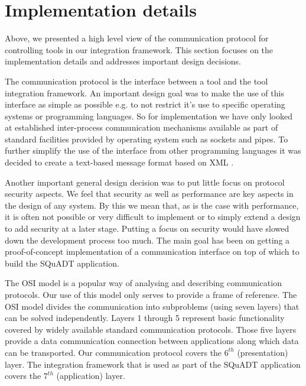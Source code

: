 \documentclass{article}
\newcommand{\squadt}{SQuADT\xspace}
\begin{document}
 \section{Implementation details} \label{s:protocol_implementation}

   Above, we presented a high level view of the communication protocol for
   controlling tools in our integration framework. This section focuses on the
   implementation details and addresses important design decisions.
   
   The communication protocol is the interface between a tool and the tool
   integration framework. An important design goal was to make the use of this
   interface as simple as possible e.g. to not restrict it's use to specific
   operating systems or programming languages. So for implementation we
   have only looked at established inter-process communication mechanisms
   available as part of standard facilities provided by operating system such
   as sockets and pipes.  To further simplify the use of the interface from
   other programming languages it was decided to create a text-based message
   format based on XML \cite{XML-1_0-4}.

   Another important general design decision was to put little focus on protocol
   security aspects. We feel that security as well as performance are key
   aspects in the design of any system. By this we mean that, as is the case with
   performance, it is often not possible or very difficult to implement or to
   simply extend a design to add security at a later stage. Putting a focus on
   security would have slowed down the development process too much. The main
   goal has been on getting a proof-of-concept implementation of a
   communication interface on top of which to build the \squadt application.

   The OSI model \cite{Day1983} is a popular way of analysing and describing
   communication protocols. Our use of this model only serves to provide a
   frame of reference. The OSI model divides the communication into subproblems
   (using seven layers) that can be solved independently. Layers 1 through 5
   represent basic functionality covered by widely available standard
   communication protocols. Those five layers provide a data communication
   connection between applications along which data can be transported.  Our
   communication protocol covers the $6^{th}$ (presentation) layer. The
   integration framework that is used as part of the \squadt application covers
   the $7^{th}$ (application) layer.
   
\end{document}
